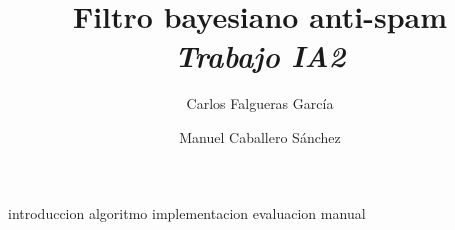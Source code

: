 \documentclass[pdftex,a4paper,12pt]{article}
\title{{\Huge Filtro bayesiano anti-spam} \\ {\large\slshape Trabajo IA2}}
\author{Carlos Falgueras García \and Manuel Caballero Sánchez}
\date{}
\begin{document}
\maketitle
\clearpage
\tableofcontents
\setlength{\parskip}{1em}
\thispagestyle{empty} %
\clearpage

{introduccion}
\clearpage
{algoritmo}
\clearpage
{implementacion}
\clearpage
{evaluacion}
\clearpage
{manual}
\clearpage
\nocite{*}

\end{document}
